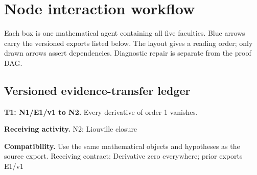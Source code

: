 \documentclass[preprint,12pt,aps,pra,showkeys,amsmath,amssymb,superscriptaddress,floatfix]{revtex4-2}
\theoremstyle{definition}
\theoremstyle{remark}
\newcommand{\field}[2]{\par\smallskip\noindent\textbf{#1.} #2\par}
\begin{document}
\clearpage\section{Node interaction workflow}

\begin{center}\end{center}

Each box is one mathematical agent containing all five faculties. Blue
arrows carry the versioned exports listed below. The layout gives a
reading order; only drawn arrows assert dependencies. Diagnostic repair
is separate from the proof DAG.

\subsection{Versioned evidence-transfer ledger}

\begingroup\small\linespread{1.05}\selectfont

\field{T1: N1/E1/v1 to N2}{Every derivative of order 1 vanishes.}

\field{Receiving activity}{N2: Liouville closure}

\field{Compatibility}{Use the same mathematical objects and hypotheses as the source export.
Receiving contract: Derivative zero everywhere; prior exports E1/v1}
\end{document}
